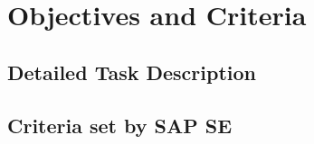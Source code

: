 \chapter{Objectives and Criteria}
\section{Detailed Task Description}
\section{Criteria set by SAP SE}